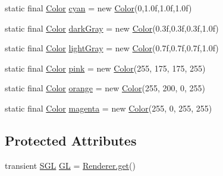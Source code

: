\begin{DoxyCompactItemize}
\item 
static final \mbox{\hyperlink{classorg_1_1newdawn_1_1slick_1_1_color}{Color}} \mbox{\hyperlink{classorg_1_1newdawn_1_1slick_1_1_color_ae296d247f4920ee8be313168843d4710}{cyan}} = new \mbox{\hyperlink{classorg_1_1newdawn_1_1slick_1_1_color}{Color}}(0,1.\+0f,1.\+0f,1.\+0f)
\item 
static final \mbox{\hyperlink{classorg_1_1newdawn_1_1slick_1_1_color}{Color}} \mbox{\hyperlink{classorg_1_1newdawn_1_1slick_1_1_color_a3041c0509804a86fa409b21b832ad2d2}{dark\+Gray}} = new \mbox{\hyperlink{classorg_1_1newdawn_1_1slick_1_1_color}{Color}}(0.\+3f,0.\+3f,0.\+3f,1.\+0f)
\item 
static final \mbox{\hyperlink{classorg_1_1newdawn_1_1slick_1_1_color}{Color}} \mbox{\hyperlink{classorg_1_1newdawn_1_1slick_1_1_color_ab7a90077a21b608c4e4e7080e4a692bc}{light\+Gray}} = new \mbox{\hyperlink{classorg_1_1newdawn_1_1slick_1_1_color}{Color}}(0.\+7f,0.\+7f,0.\+7f,1.\+0f)
\item 
static final \mbox{\hyperlink{classorg_1_1newdawn_1_1slick_1_1_color}{Color}} \mbox{\hyperlink{classorg_1_1newdawn_1_1slick_1_1_color_a08fa04ac09bbd960dffd1dd1d23a3831}{pink}} = new \mbox{\hyperlink{classorg_1_1newdawn_1_1slick_1_1_color}{Color}}(255, 175, 175, 255)
\item 
static final \mbox{\hyperlink{classorg_1_1newdawn_1_1slick_1_1_color}{Color}} \mbox{\hyperlink{classorg_1_1newdawn_1_1slick_1_1_color_a5e08f313b06661c5d50b11456bd2b3c7}{orange}} = new \mbox{\hyperlink{classorg_1_1newdawn_1_1slick_1_1_color}{Color}}(255, 200, 0, 255)
\item 
static final \mbox{\hyperlink{classorg_1_1newdawn_1_1slick_1_1_color}{Color}} \mbox{\hyperlink{classorg_1_1newdawn_1_1slick_1_1_color_ab806bfc25e9cab954c1056a692ef6925}{magenta}} = new \mbox{\hyperlink{classorg_1_1newdawn_1_1slick_1_1_color}{Color}}(255, 0, 255, 255)
\end{DoxyCompactItemize}
\subsection*{Protected Attributes}
\begin{DoxyCompactItemize}
\item 
transient \mbox{\hyperlink{interfaceorg_1_1newdawn_1_1slick_1_1opengl_1_1renderer_1_1_s_g_l}{S\+GL}} \mbox{\hyperlink{classorg_1_1newdawn_1_1slick_1_1_color_a7b30c78e29cffe055c92a2118ce3164a}{GL}} = \mbox{\hyperlink{classorg_1_1newdawn_1_1slick_1_1opengl_1_1renderer_1_1_renderer_abe742c3a7dfca67c6c01821d27087308}{Renderer.\+get}}()
\end{DoxyCompactItemize}

